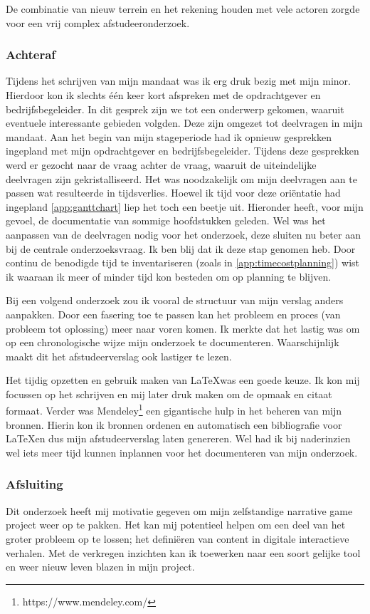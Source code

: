 De combinatie van nieuw terrein en het rekening houden met vele actoren zorgde voor een vrij complex afstudeeronderzoek.

\subsubsection{Achteraf}
Tijdens het schrijven van mijn mandaat was ik erg druk bezig met mijn minor. Hierdoor kon ik slechts één keer kort afspreken met de opdrachtgever en bedrijfsbegeleider. In dit gesprek zijn we tot een onderwerp gekomen, waaruit eventuele interessante gebieden volgden. Deze zijn omgezet tot deelvragen in mijn mandaat. Aan het begin van mijn stageperiode had ik opnieuw gesprekken ingepland met mijn opdrachtgever en bedrijfsbegeleider. Tijdens deze gesprekken werd er gezocht naar de vraag achter de vraag, waaruit de uiteindelijke deelvragen zijn gekristalliseerd. Het was noodzakelijk om mijn deelvragen aan te passen wat resulteerde in tijdsverlies. Hoewel ik tijd voor deze oriëntatie had ingepland \autoref{app:ganttchart} liep het toch een beetje uit. Hieronder heeft, voor mijn gevoel, de documentatie van sommige hoofdstukken geleden. Wel was het aanpassen van de deelvragen nodig voor het onderzoek, deze sluiten nu beter aan bij de centrale onderzoeksvraag. Ik ben blij dat ik deze stap genomen heb. Door continu de benodigde tijd te inventariseren (zoals in \autoref{app:timecostplanning}) wist ik waaraan ik meer of minder tijd kon besteden om op planning te blijven.

Bij een volgend onderzoek zou ik vooral de structuur van mijn verslag anders aanpakken. Door een fasering toe te passen kan het probleem en proces (van probleem tot oplossing) meer naar voren komen. Ik merkte dat het lastig was om op een chronologische wijze mijn onderzoek te documenteren. Waarschijnlijk maakt dit het afstudeerverslag ook lastiger te lezen.

Het tijdig opzetten en gebruik maken van \LaTeX was een goede keuze. Ik kon mij focussen op het schrijven en mij later druk maken om de opmaak en citaat formaat. Verder was Mendeley\footnote{https://www.mendeley.com/} een gigantische hulp in het beheren van mijn bronnen. Hierin kon ik bronnen ordenen en automatisch een bibliografie voor \LaTeX en dus mijn afstudeerverslag laten genereren. Wel had ik bij naderinzien wel iets meer tijd kunnen inplannen voor het documenteren van mijn onderzoek.

\subsubsection{Afsluiting}
Dit onderzoek heeft mij motivatie gegeven om mijn zelfstandige narrative game project weer op te pakken. Het kan mij potentieel helpen om een deel van het groter probleem op te lossen; het definiëren van content in digitale interactieve verhalen. Met de verkregen inzichten kan ik toewerken naar een soort gelijke tool en weer nieuw leven blazen in mijn project.